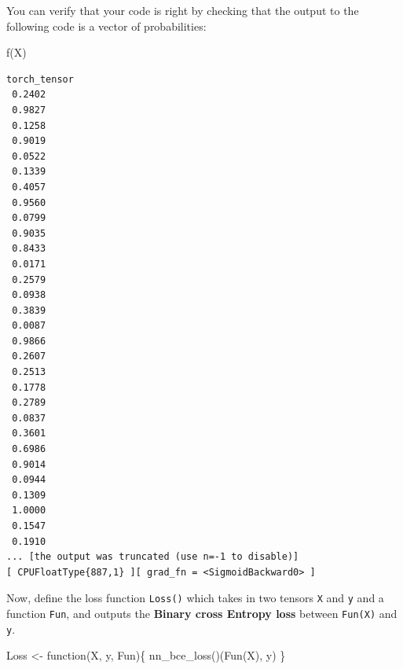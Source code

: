 \documentclass[
  letterpaper,
  DIV=11,
  numbers=noendperiod]{scrartcl}
\newenvironment{Shaded}{\begin{snugshade}}{\end{snugshade}}
\newcommand{\AttributeTok}[1]{\textcolor[rgb]{0.40,0.45,0.13}{#1}}
\newcommand{\ControlFlowTok}[1]{\textcolor[rgb]{0.00,0.23,0.31}{#1}}
\newcommand{\DecValTok}[1]{\textcolor[rgb]{0.68,0.00,0.00}{#1}}
\newcommand{\FunctionTok}[1]{\textcolor[rgb]{0.28,0.35,0.67}{#1}}
\newcommand{\NormalTok}[1]{\textcolor[rgb]{0.00,0.23,0.31}{#1}}
\newcommand{\OtherTok}[1]{\textcolor[rgb]{0.00,0.23,0.31}{#1}}
\newcommand{\SpecialCharTok}[1]{\textcolor[rgb]{0.37,0.37,0.37}{#1}}
\begin{document}
\begin{Shaded}
\end{Shaded}

You can verify that your code is right by checking that the output to
the following code is a vector of probabilities:

\begin{Shaded}
\begin{Highlighting}[]
\FunctionTok{f}\NormalTok{(X)}
\end{Highlighting}
\end{Shaded}

\begin{verbatim}
torch_tensor
 0.2402
 0.9827
 0.1258
 0.9019
 0.0522
 0.1339
 0.4057
 0.9560
 0.0799
 0.9035
 0.8433
 0.0171
 0.2579
 0.0938
 0.3839
 0.0087
 0.9866
 0.2607
 0.2513
 0.1778
 0.2789
 0.0837
 0.3601
 0.6986
 0.9014
 0.0944
 0.1309
 1.0000
 0.1547
 0.1910
... [the output was truncated (use n=-1 to disable)]
[ CPUFloatType{887,1} ][ grad_fn = <SigmoidBackward0> ]
\end{verbatim}

Now, define the loss function \texttt{Loss()} which takes in two tensors
\texttt{X} and \texttt{y} and a function \texttt{Fun}, and outputs the
\textbf{Binary cross Entropy loss} between \texttt{Fun(X)} and
\texttt{y}.

\begin{Shaded}
\begin{Highlighting}[]
\NormalTok{Loss }\OtherTok{\textless{}{-}} \ControlFlowTok{function}\NormalTok{(X, y, Fun)\{}
  \FunctionTok{nn\_bce\_loss}\NormalTok{()(}\FunctionTok{Fun}\NormalTok{(X), y)}
\NormalTok{\}}
\end{Highlighting}
\end{Shaded}
\end{document}
